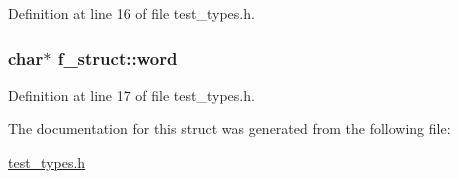 Definition at line 16 of file test\-\_\-types.\-h.

\hypertarget{structf__struct_aa8f65f08c5e6180da916f9001438eab5}{
\subsubsection[{word}]{\setlength{\rightskip}{0pt plus 5cm}char$\ast$ f\-\_\-struct\-::word}}\label{structf__struct_aa8f65f08c5e6180da916f9001438eab5}


Definition at line 17 of file test\-\_\-types.\-h.



The documentation for this struct was generated from the following file\-:\begin{DoxyCompactItemize}
\item 
\hyperlink{test__types_8h}{test\-\_\-types.\-h}\end{DoxyCompactItemize}
